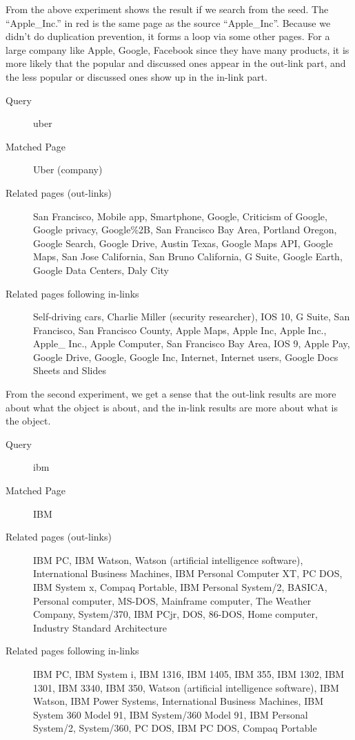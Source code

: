 \documentclass[12pt]{amsart}
\newcommand{\0}{\mat{0}}
\newcommand{\1}{\mathds{1}}
\begin{document}
From the above experiment shows the result if we search from the seed. The ``Apple\_Inc.'' in red is the same page as the source ``Apple\_Inc''. Because we didn't do duplication prevention, it forms a loop via some other pages. For a large company like Apple, Google, Facebook since they have many products, it is more likely that the popular and discussed ones appear in the out-link part, and the less popular or discussed ones show up in the in-link part. 

\begin{description}
\item[Query] uber
\item[Matched Page] Uber (company)
\item[Related pages (out-links)] San Francisco, Mobile app, Smartphone, Google, Criticism of Google, Google privacy, Google\%2B, San Francisco Bay Area, Portland Oregon, Google Search, Google Drive, Austin Texas, Google Maps API, Google Maps, San Jose California, San Bruno California, G Suite, Google Earth, Google Data Centers, Daly City 
\item[Related pages following in-links] Self-driving cars, Charlie Miller (security researcher), IOS 10, G Suite, San Francisco, San Francisco County, Apple Maps, Apple Inc, Apple Inc., Apple\_ Inc., Apple Computer, San Francisco Bay Area, IOS 9, Apple Pay, Google Drive, Google, Google Inc, Internet, Internet users, Google Docs  Sheets and Slides
\end{description}

From the second experiment, we get a sense that the out-link results are more about what the object is about, and the in-link results are more about what is the object. 



\begin{description}
\item[Query] ibm
\item[Matched Page] IBM 
\item[Related pages (out-links)] IBM PC, IBM Watson, Watson (artificial intelligence software), International Business Machines, IBM Personal Computer XT, PC DOS, IBM System x, Compaq Portable, IBM Personal System/2, BASICA, Personal computer, MS-DOS, Mainframe computer, The Weather Company, System/370, IBM PCjr, DOS, 86-DOS, Home computer, Industry Standard Architecture
\item[Related pages following in-links] IBM PC, IBM System i, {\color{red}IBM 1316, IBM 1405, IBM 355, IBM 1302, IBM 1301, IBM 3340, IBM 350}, Watson (artificial intelligence software), IBM Watson, IBM Power Systems, International Business Machines, IBM System 360 Model 91, IBM System/360 Model 91, IBM Personal System/2, System/360, PC DOS, IBM PC DOS, Compaq Portable
\end{description}
\end{document}
